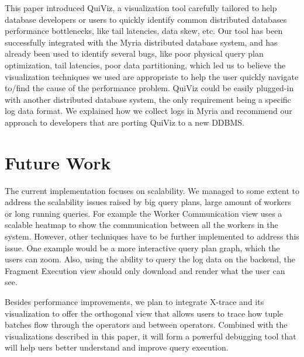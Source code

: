 \documentclass{chi2009}
\newcommand*{\system}{QuiViz\xspace}
\newcommand*{\fragment}{Fragment Execution\xspace}
\newcommand*{\network}{Worker Communication\xspace}
\begin{document}
This paper introduced \system, a visualization tool carefully tailored to help
database developers or users to quickly identify common distributed databases
performance bottlenecks, like tail latencies, data skew, etc. Our tool has been
successfully integrated with the Myria distributed database system, and has already
been used to identify several bugs, like poor physical query plan optimization,
tail latencies, poor data partitioning, which led us to believe the
visualization techniques we used are appropriate to help the user quickly
navigate to/find the cause of the performance problem. \system could be easily
plugged-in with another distributed database system, the only requirement being
a specific log data format. We explained how we collect logs in Myria and recommend
our approach to developers that are porting \system to a new DDBMS.


\section{Future Work}

The current implementation focuses on scalability. We managed to some extent to
address the scalability issues raised by big query plans, large amount of
workers or long running queries. For example the \network view uses a
scalable heatmap to show the communication between all the workers in the
system. However, other techniques have to be further implemented to address
this issue. One example would be a more interactive query plan graph, which the
users can zoom. Also, using the ability to query the log data on the backend,
the \fragment view should only download and render what the user can see.

Besides performance improvements, we plan to integrate X-trace and its
visualization to offer the orthogonal view that allows users to trace how tuple
batches flow through the operators and between operators. Combined with the
visualizations described in this paper, it will form a powerful debugging tool
that will help uers better understand and improve query execution.



\end{document}
